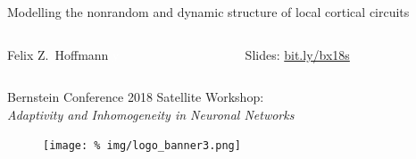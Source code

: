 \begin{frame}
  \vspace{0.6cm}
  
  \begin{center} 
    \huge Modelling the nonrandom and dynamic structure of local
    cortical circuits
  \end{center}
  
  \vspace{1.1cm}

  \large
  \begin{columns}[t]
    \hfill\Large
    \begin{column}{0.4\textwidth}
      \minipage[c][0.2\textheight][s]{\columnwidth}
      \hspace{0.6cm} Felix Z.~Hoffmann \textcolor{white}{y}
      \endminipage                 
    \end{column}
    \begin{column}{0.4\textwidth}
      \minipage[c][0.2\textheight][s]{\columnwidth}
      \hspace{0.6cm} Slides: \href{http://bit.ly/bx18s}{bit.ly/bx18s}
      \endminipage           
    \end{column}
    \hfill
  \end{columns}

  \vspace{-0.3cm}


  \begin{center}
    \Large Bernstein Conference 2018 Satellite Workshop:\\
    \textit{Adaptivity and Inhomogeneity in Neuronal Networks}
  \end{center}

  \bigskip
  \medskip

  \vspace{0.5cm}
  
  \begin{figure}
    \centering
    \texttt{[image: \%
      img/logo\_banner3.png]} %
  \end{figure}



\end{frame}

